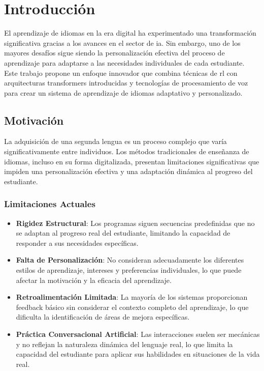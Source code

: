 \chapter{Introducción}
\label{introduccion}

El aprendizaje de idiomas en la era digital ha experimentado una transformación significativa gracias a los avances en el sector de \gls{ia}. Sin embargo, uno de los mayores desafíos sigue siendo la personalización efectiva del proceso de aprendizaje para adaptarse a las necesidades individuales de cada estudiante. Este trabajo propone un enfoque innovador que combina técnicas de \gls{rl} con arquitecturas \gls{transformers} introducidas y tecnologías de procesamiento de voz para crear un sistema de aprendizaje de idiomas adaptativo y personalizado.

\section{Motivación}
\label{motivacion}

La adquisición de una segunda lengua es un proceso complejo que varía significativamente entre individuos. Los métodos tradicionales de enseñanza de idiomas, incluso en su forma digitalizada, presentan limitaciones significativas que impiden una personalización efectiva y una adaptación dinámica al progreso del estudiante.

\subsection{Limitaciones Actuales}
\label{limitaciones-actuales}

\begin{itemize}
  \item \textbf{Rigidez Estructural}: Los programas siguen secuencias predefinidas que no se adaptan al progreso real del estudiante, limitando la capacidad de responder a sus necesidades específicas.
  \item \textbf{Falta de Personalización}: No consideran adecuadamente los diferentes estilos de aprendizaje, intereses y preferencias individuales, lo que puede afectar la motivación y la eficacia del aprendizaje.
  \item \textbf{Retroalimentación Limitada}: La mayoría de los sistemas proporcionan feedback básico sin considerar el contexto completo del aprendizaje, lo que dificulta la identificación de áreas de mejora específicas.
  \item \textbf{Práctica Conversacional Artificial}: Las interacciones suelen ser mecánicas y no reflejan la naturaleza dinámica del lenguaje real, lo que limita la capacidad del estudiante para aplicar sus habilidades en situaciones de la vida real.
\end{itemize}


